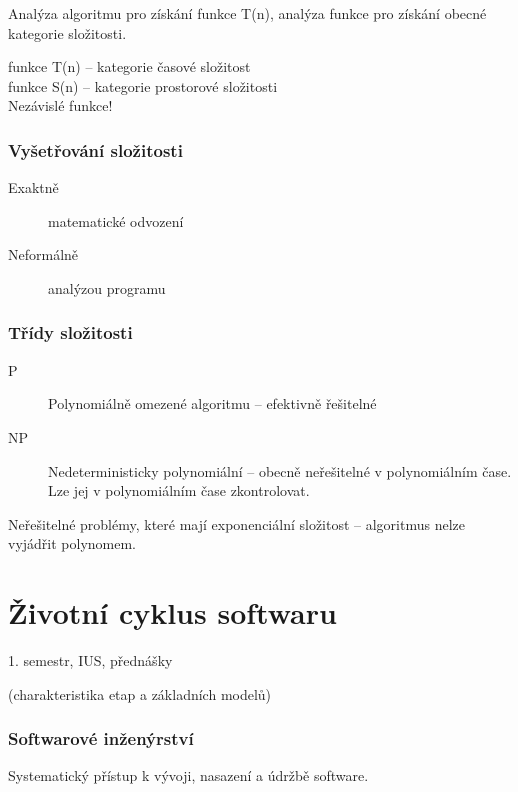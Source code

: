 \documentclass[a4paper, 11pt]{report}
\begin{document}
Analýza algoritmu pro získání funkce T(n), analýza funkce pro získání obecné kategorie složitosti.

funkce T(n) -- kategorie časové složitost\\
funkce S(n) -- kategorie prostorové složitosti\\
Nezávislé funkce!

\subsection{Vyšetřování složitosti}

\begin{description}
	\item[Exaktně] matematické odvození
	\item[Neformálně] analýzou programu
\end{description}

\subsection{Třídy složitosti}
\begin{description}
	\item[P] Polynomiálně omezené algoritmu -- efektivně řešitelné
	\item[NP] Nedeterministicky polynomiální -- obecně neřešitelné v polynomiálním čase. Lze jej v polynomiálním čase zkontrolovat.
\end{description}
Neřešitelné problémy, které mají exponenciální složitost -- algoritmus nelze vyjádřit polynomem.














\chapter{Životní cyklus softwaru} \label{cha:30}

1. semestr, IUS, přednášky

(charakteristika etap a základních modelů)

\subsection{Softwarové inženýrství}
Systematický přístup k vývoji, nasazení a údržbě software.
\end{document}

